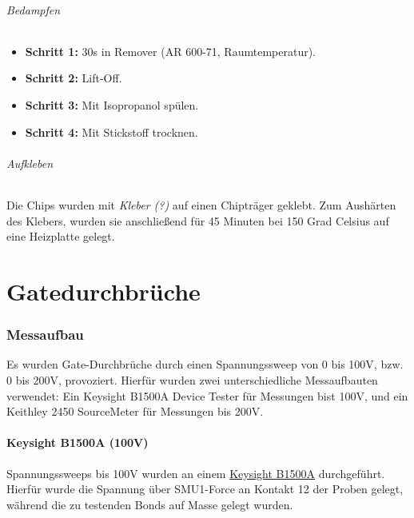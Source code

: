 \documentclass[
  paper=a4,
  ,captions=tableheading
]{scrartcl}
\providecommand{\tightlist}{%
  \setlength{\itemsep}{0pt}\setlength{\parskip}{0pt}}
\begin{document}
\hypertarget{bedampfen}{%
\paragraph{Bedampfen}\label{bedampfen}}

\begin{itemize}
\tightlist
\item
  \textbf{Schritt 1:} 30s in Remover (AR 600-71, Raumtemperatur).
\item
  \textbf{Schritt 2:} Lift-Off.
\item
  \textbf{Schritt 3:} Mit Isopropanol spülen.
\item
  \textbf{Schritt 4:} Mit Stickstoff trocknen.
\end{itemize}

\hypertarget{aufkleben}{%
\paragraph{Aufkleben}\label{aufkleben}}

Die Chips wurden mit \emph{Kleber (?)} auf einen Chipträger geklebt. Zum Aushärten des Klebers, wurden sie anschließend für 45 Minuten bei 150 Grad Celsius auf eine Heizplatte gelegt.

\hypertarget{gatebreak}{%
\part{Gatedurchbrüche}\label{gatebreak}}

\hypertarget{setup}{%
\section{Messaufbau}\label{setup}}

Es wurden Gate-Durchbrüche durch einen Spannungssweep von 0 bis 100V, bzw. 0 bis 200V, provoziert. Hierfür wurden zwei unterschiedliche Messaufbauten verwendet: Ein Keysight B1500A Device Tester für Messungen bist 100V, und ein Keithley 2450 SourceMeter für Messungen bis 200V.

\hypertarget{keysight}{%
\subsection{Keysight B1500A (100V)}\label{keysight}}

Spannungssweeps bis 100V wurden an einem \href{https://www.keysight.com/de/de/products/parameter-device-analyzers-curve-tracer/precision-current-voltage-analyzers/b1500a-semiconductor-device-parameter-analyzer.html}{Keysight B1500A} durchgeführt. Hierfür wurde die Spannung über SMU1-Force an Kontakt 12 der Proben gelegt, während die zu testenden Bonds auf Masse gelegt wurden.
\end{document}
